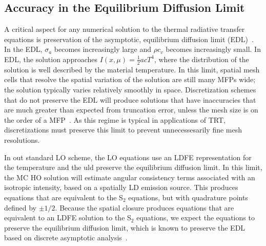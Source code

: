 \subsection{Accuracy in the Equilibrium Diffusion Limit}
\label{sec:edl_overview}

A critical aspect for any numerical solution to the thermal radiative transfer equations
is preservation of the asymptotic, equilibrium diffusion limit (EDL)~\cite{morel_ldtrt,larsen_edl}.
In the EDL,  $\sigma_a$ becomes increasingly large and $\rho c_v$ becomes increasingly
small.  In EDL, the solution approaches $I(x,\mu)=\frac{1}{2}acT^4$, where the
distribution of the solution is well described by the material temperature.  In this
limit, spatial mesh cells that resolve the spatial variation of the solution are still many
MFPs wide; the solution typically varies relatively smoothly in space.
Discretization schemes that do not preserve the EDL will produce solutions
that have inaccuracies that are much greater than expected from truncation error, unless
the mesh size is on the order of a MFP~\cite{morel_ldtrt}.  As this regime is typical in
applications of TRT, discretizations must preserve this limit to prevent unnecessesarily
fine mesh resolutions.

In out standard LO scheme, the
LO equations use an LDFE representation for the temperature and the uld preserve the equilibrium diffusion limit.  In this limit, the MC HO
solution will estimate angular consistency terms associated with an isotropic intensity,
based on a spatially LD emission source.  This produces equations that are equivalent to
the S$_2$ equations, but with quadrature points defined by $\pm 1/2$.  Because the spatial closure produces equations that are equivalent to an LDFE
solution to the S$_2$ equations, we expect the equations to preserve the equilibrium diffusion
limit, which is known to preserve the EDL based on discrete asymptotic analysis~\cite{morel_ldtrt}.
